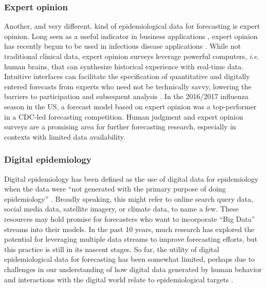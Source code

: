 \documentclass[a4paper]{article}
\newcommand{\ie}{\textit{i}.\textit{e}. }
\begin{document}
\subsubsection*{Expert opinion}
Another, and very different, kind of epidemiological data for forecasting is expert opinion. 
Long seen as a useful indicator in business applications \cite{Surowiecki2004}, expert opinion has recently begun to be used in infectious disease applications \cite{farrow2017human, deiner2017short}.
While not traditional clinical data, expert opinion surveys leverage powerful computers, \ie human brains, that can synthesize historical experience with real-time data.\cite{budescu2014identifying} 
Intuitive interfaces can facilitate the specification of quantitative and digitally entered forecasts from experts who need not be technically savvy, lowering the barriers to participation and subsequent analysis \cite{farrow2017human}.
In the 2016/2017 influenza season in the US, a forecast model based on expert opinion was a top-performer in a CDC-led forecasting competition.\cite{mcgowan2019collaborative,reich2019collaborative}
Human judgment and expert opinion surveys are a promising area for further forecasting research, especially in contexts with limited data availability.

\subsubsection*{Digital epidemiology}\label{sec:digiepi}
Digital epidemiology has been defined as the use of digital data for epidemiology when the data were ``not generated with the primary purpose of doing epidemiology'' \cite{Salathe2018}.
Broadly speaking, this might refer to online search query data, social media data, satellite imagery, or climate data, to name a few. 
These resources may hold promise for forecasters who want to incorporate ``Big Data'' streams into their models.
In the past 10 years, much research has explored the potential for leveraging multiple data streams to improve forecasting efforts, but this practice is still in its nascent stages. 
So far, the utility of digital epidemiological data for forecasting has been somewhat limited, perhaps due to challenges in our understanding of how digital data generated by human behavior and interactions with the digital world relate to epidemiological targets \cite{moran2016epidemic, Priedhorsky2017, Salathe2018}.
\end{document}
